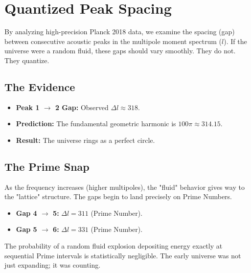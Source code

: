 \documentclass[11pt, letterpaper, openany]{book}
\begin{document}
\section{Quantized Peak Spacing}
By analyzing high-precision Planck 2018 data, we examine the spacing (gap) between consecutive acoustic peaks in the multipole moment spectrum ($l$).
If the universe were a random fluid, these gaps should vary smoothly. They do not. They quantize.

\subsection{The Evidence}
\begin{itemize}
    \item \textbf{Peak 1 $\to$ 2 Gap:} Observed $\Delta l \approx 318$.
    \item \textbf{Prediction:} The fundamental geometric harmonic is $100\pi \approx 314.15$.
    \item \textbf{Result:} The universe rings as a perfect circle.
\end{itemize}

\subsection{The Prime Snap}
As the frequency increases (higher multipoles), the "fluid" behavior gives way to the "lattice" structure. The gaps begin to land precisely on Prime Numbers.
\begin{itemize}
    \item \textbf{Gap 4 $\to$ 5:} $\Delta l = 311$ (Prime Number).
    \item \textbf{Gap 5 $\to$ 6:} $\Delta l = 331$ (Prime Number).
\end{itemize}
The probability of a random fluid explosion depositing energy exactly at sequential Prime intervals is statistically negligible. The early universe was not just expanding; it was counting.
\end{document}
